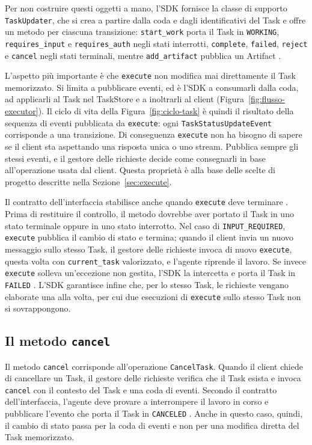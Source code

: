 Per non costruire questi oggetti a mano, l'SDK fornisce la classe di supporto \texttt{TaskUpdater}, che si crea a partire dalla coda e dagli identificativi del Task e offre un metodo per ciascuna transizione: \texttt{start\_work} porta il Task in \texttt{WORKING}, \texttt{requires\_input} e \texttt{requires\_auth} negli stati interrotti, \texttt{complete}, \texttt{failed}, \texttt{reject} e \texttt{cancel} negli stati terminali, mentre \texttt{add\_artifact} pubblica un Artifact \cite{a2apythonsdk}.

L'aspetto più importante è che \texttt{execute} non modifica mai direttamente il Task memorizzato. Si limita a pubblicare eventi, ed è l'SDK a consumarli dalla coda, ad applicarli al Task nel TaskStore e a inoltrarli al client (Figura~\ref{fig:flusso-executor}). Il ciclo di vita della Figura~\ref{fig:ciclo-task} è quindi il risultato della sequenza di eventi pubblicata da \texttt{execute}: ogni \texttt{TaskStatusUpdateEvent} corrisponde a una transizione. Di conseguenza \texttt{execute} non ha bisogno di sapere se il client sta aspettando una risposta unica o uno stream. Pubblica sempre gli stessi eventi, e il gestore delle richieste decide come consegnarli in base all'operazione usata dal client. Questa proprietà è alla base delle scelte di progetto descritte nella Sezione~\ref{sec:execute}.

Il contratto dell'interfaccia stabilisce anche quando \texttt{execute} deve terminare \cite{a2apythondocs}. Prima di restituire il controllo, il metodo dovrebbe aver portato il Task in uno stato terminale oppure in uno stato interrotto. Nel caso di \texttt{INPUT\_\allowbreak REQUIRED}, \texttt{execute} pubblica il cambio di stato e termina; quando il client invia un nuovo messaggio sullo stesso Task, il gestore delle richieste invoca di nuovo \texttt{execute}, questa volta con \texttt{current\_task} valorizzato, e l'agente riprende il lavoro. Se invece \texttt{execute} solleva un'eccezione non gestita, l'SDK la intercetta e porta il Task in \texttt{FAILED} \cite{a2apythonsdk}. L'SDK garantisce infine che, per lo stesso Task, le richieste vengano elaborate una alla volta, per cui due esecuzioni di \texttt{execute} sullo stesso Task non si sovrappongono.

\subsection{Il metodo \texorpdfstring{\texttt{cancel}}{cancel}}

Il metodo \texttt{cancel} corrisponde all'operazione \texttt{CancelTask}. Quando il client chiede di cancellare un Task, il gestore delle richieste verifica che il Task esista e invoca \texttt{cancel} con il contesto del Task e una coda di eventi. Secondo il contratto dell'interfaccia, l'agente deve provare a interrompere il lavoro in corso e pubblicare l'evento che porta il Task in \texttt{CANCELED} \cite{a2apythondocs}. Anche in questo caso, quindi, il cambio di stato passa per la coda di eventi e non per una modifica diretta del Task memorizzato.

